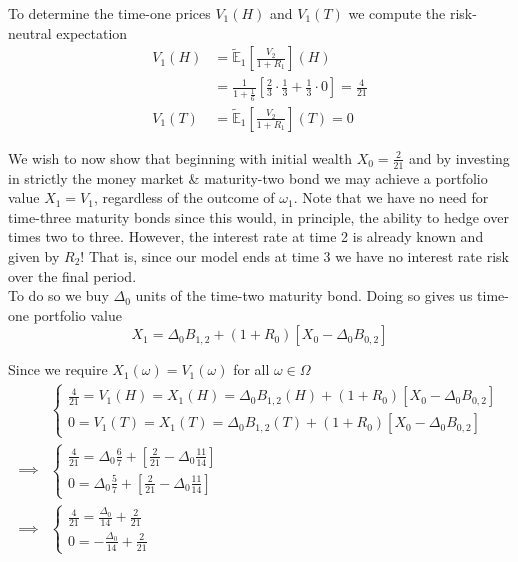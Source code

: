 \documentclass[12pt]{article}
\newlength\tindent
\renewcommand{\indent}{\hspace*{\tindent}}
\newcommand{\E}{\mathbb E}
\begin{document}
To determine the time-one prices $V_1(H)$ and $V_1(T)$ we compute the risk-neutral expectation
\begin{align*}
	V_1(H) &= \tilde{\E}_1 \left[  \frac{V_2}{1 + R_1} \right](H) \\
	&= \frac{1}{1 + \frac{1}{6}} \left[ \frac{2}{3}\cdot\frac{1}{3} + \frac{1}{3}\cdot 0 \right] = \frac{4}{21} \\
	V_1(T) &= \tilde{\E}_1 \left[  \frac{V_2}{1 + R_1} \right](T) = 0
\end{align*}

\indent We wish to now show that beginning with initial wealth $X_0 = \frac{2}{21}$ and by investing in strictly the money market \& maturity-two bond we may achieve a portfolio value $X_1 = V_1$, regardless of the outcome of $\omega_1$. Note that we have no need for time-three maturity bonds since this would, in principle, the ability to hedge over times two to three. However, the interest rate at time 2 is already known and given by $R_2$! That is, since our model ends at time 3 we have no interest rate risk over the final period. \\

\indent To do so we buy $\Delta_0$ units of the time-two maturity bond. Doing so gives us time-one portfolio value 
\begin{equation*}
	X_1 = \Delta_0 B_{1,2} + (1 + R_0)[X_0 - \Delta_0 B_{0,2}] 
\end{equation*}

Since we require $X_1(\omega) = V_1(\omega)$ for all $\omega \in \Omega$
\begin{align*}
	&\begin{cases}
		\frac{4}{21} = V_1(H) = X_1(H) = \Delta_0 B_{1,2}(H) + (1 + R_0)[X_0 - \Delta_0B_{0,2}] \\
		0 = V_1(T) = X_1(T) = \Delta_0 B_{1,2}(T) + (1 + R_0)[X_0 - \Delta_0B_{0,2}] 
	\end{cases} \\
	\implies &\begin{cases}
		\frac{4}{21} = \Delta_0 \frac{6}{7} + \left[ \frac{2}{21} - \Delta_0 \frac{11}{14}\right] \\
		0 = \Delta_0 \frac{5}{7} + \left[ \frac{2}{21} - \Delta_0 \frac{11}{14} \right] 
	\end{cases} \\
	\implies &\begin{cases}
		\frac{4}{21} = \frac{ \Delta_0 }{14} + \frac{2}{21} \\
		0 = -\frac{ \Delta_0 }{14} + \frac{2}{21}
	\end{cases}
\end{align*}
\end{document}
